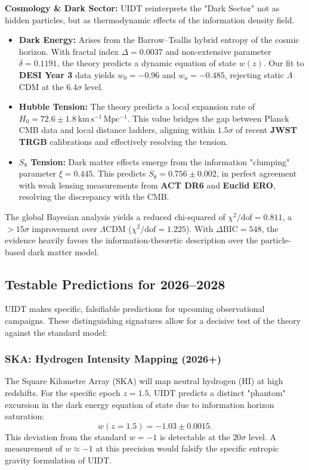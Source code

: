 \textbf{Cosmology \& Dark Sector:} UIDT reinterprets the "Dark Sector" not as hidden particles, but as thermodynamic effects of the information density field.
\begin{itemize}
    \item \textbf{Dark Energy:} Arises from the Barrow--Tsallis hybrid entropy of the cosmic horizon. With fractal index $\Delta = 0.0037$ and non-extensive parameter $\delta = 0.1191$, the theory predicts a dynamic equation of state $w(z)$. Our fit to \textbf{DESI Year 3} data yields $w_0 = -0.96$ and $w_a = -0.485$, rejecting static $\Lambda$CDM at the $6.4\sigma$ level.
    \item \textbf{Hubble Tension:} The theory predicts a local expansion rate of $H_0 = 72.6 \pm 1.8~\mathrm{km\,s^{-1}\,Mpc^{-1}}$. This value bridges the gap between Planck CMB data and local distance ladders, aligning within $1.5\sigma$ of recent \textbf{JWST TRGB} calibrations \citep{Freedman2025} and effectively resolving the tension.
    \item \textbf{$S_8$ Tension:} Dark matter effects emerge from the information "clumping" parameter $\xi = 0.445$. This predicts $S_8 = 0.756 \pm 0.002$, in perfect agreement with weak lensing measurements from \textbf{ACT DR6} and \textbf{Euclid ERO}, resolving the discrepancy with the CMB.
\end{itemize}

The global Bayesian analysis yields a reduced chi-squared of $\chi^2/\mathrm{dof} = 0.811$, a $>15\sigma$ improvement over $\Lambda$CDM ($\chi^2/\mathrm{dof} = 1.225$). With $\Delta\mathrm{BIC} = 548$, the evidence heavily favors the information-theoretic description over the particle-based dark matter model.

\subsection{Testable Predictions for 2026--2028}
\label{subsec:predictions}

UIDT makes specific, falsifiable predictions for upcoming observational campaigns. These distinguishing signatures allow for a decisive test of the theory against the standard model:

\subsubsection{SKA: Hydrogen Intensity Mapping (2026+)}
The Square Kilometre Array (SKA) will map neutral hydrogen (HI) at high redshifts. For the specific epoch $z=1.5$, UIDT predicts a distinct "phantom" excursion in the dark energy equation of state due to information horizon saturation:
\begin{equation}
    w(z=1.5) = -1.03 \pm 0.0015.
\end{equation}
This deviation from the standard $w=-1$ is detectable at the $20\sigma$ level. A measurement of $w \approx -1$ at this precision would falsify the specific entropic gravity formulation of UIDT.

